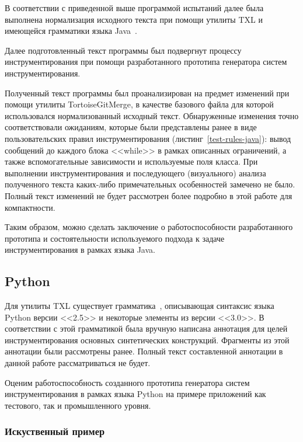 В соответствии с приведенной выше программой испытаний далее была выполнена нормализация исходного текста при помощи утилиты TXL и имеющейся грамматики языка Java~\cite{txl-resources}.

Далее подготовленный текст программы был подвергнут процессу инструментирования при помощи разработанного прототипа генератора систем инструментирования.

Полученный текст программы был проанализирован на предмет изменений при помощи утилиты TortoiseGitMerge, в качестве базового файла для которой использовался нормализованный исходный текст.
Обнаруженные изменения точно соответствовали ожиданиям, которые были представлены ранее в виде пользовательских правил инструментирования (листинг~\ref{test-rules-java}):
вывод сообщений до каждого блока <<while>> в рамках описанных ограничений,
а также вспомогательные зависимости и используемые поля класса.
При выполнении инструментирования и последующего (визуального) анализа полученного текста каких-либо примечательных особенностей замечено не было.
Полный текст изменений не будет рассмотрен более подробно в этой работе для компактности.

Таким образом, можно сделать заключение о работоспособности разработанного прототипа и состоятельности используемого подхода к задаче инструментирования в рамках языка Java.

\subsection{Python}

Для утилиты TXL существует грамматика~\cite{txl-resources}, описывающая синтаксис языка Python версии <<2.5>> и некоторые элементы из версии <<3.0>>.
В соответствии с этой грамматикой была вручную написана аннотация для целей инструментирования основных синтетических конструкций.
Фрагменты из этой аннотации были рассмотрены ранее.
Полный текст составленной аннотации в данной работе рассматриваться не будет.

Оценим работоспособность созданного прототипа генератора систем инструментирования в рамках языка Python на примере приложений как тестового, так и промышленного уровня.

\subsubsection{Искуственный пример}

